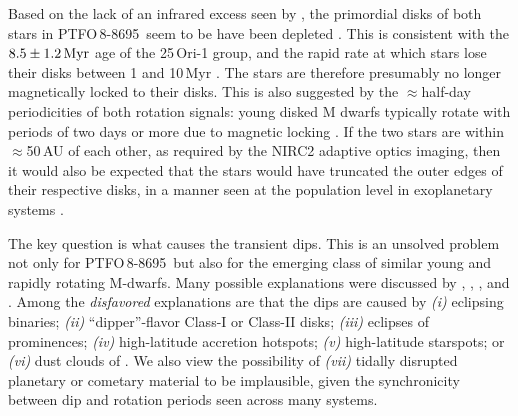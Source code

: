 \documentclass[12pt,twocolumn,tighten,trackchanges]{aastex62}
\newcommand{\ptfo}{PTFO$\,$8-8695}
\begin{document}
Based on the lack of an infrared excess seen by \citet{yu_tests_2015},
the primordial  disks of both stars in \ptfo\ seem to be
have been depleted .
This is consistent with the $8.5\pm1.2\,{\rm Myr}$ age of the
25$\,$Ori-1 group, and the rapid rate at which stars 
lose their disks between 1 and 10$\,$Myr \citep[{\it
e.g.},][]{hernandez_spitzer_ob1_2007}.  The stars are therefore
presumably no longer magnetically locked to their disks.  This is also
suggested by the $\approx$half-day periodicities of both rotation
signals: young disked M dwarfs typically rotate with periods of two
days or more due to magnetic locking \citep[{\it
e.g.},][]{rebull_rotation_2020}.  If the two stars are within
$\approx$50$\,$AU of each other, as required by the NIRC2 adaptive
optics imaging, then it would also be expected that the stars would
have truncated the outer edges of their respective disks, in a manner
seen at the population level in exoplanetary systems
\citep{kraus_impact_2016,moe_impact_2019}.

The key question is what causes the transient dips. This is an
unsolved problem not only for \ptfo\ but also for the emerging class
of similar young and rapidly rotating M-dwarfs.  Many possible
explanations were discussed by \citet{rebull_rotation_2016},
\citet{david_transient_2017}, \citet{stauffer_orbiting_2017}, and
\citet{zhan_complex_2019}.  Among the {\it disfavored} explanations
are that the dips are caused by
{\it (i)} eclipsing binaries;
{\it (ii)} ``dipper''-flavor Class-I or Class-II disks;
{\it (iii)} eclipses of prominences;
{\it (iv)} high-latitude accretion hotspots;
{\it (v)} high-latitude starspots;
or {\it (vi)} dust clouds of .  We also view the possibility
of {\it (vii)} tidally disrupted planetary or cometary material to be
implausible, given the synchronicity between dip and rotation periods
seen across many systems.
\end{document}
